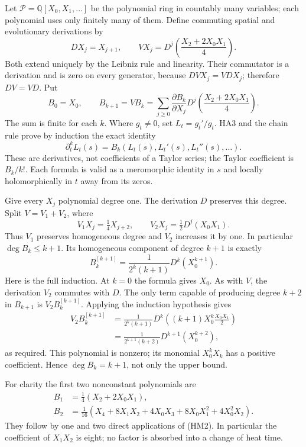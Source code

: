 \documentclass[
  10pt,
  a4paper,
]{article}
\begin{document}
Let \(\mathscr P=\mathbb Q[X_0,X_1,\ldots]\) be the polynomial ring in
countably many variables; each polynomial uses only finitely many of
them. Define commuting spatial and evolutionary derivations by \[
D X_j=X_{j+1},\qquad
V X_j=D^j\!\left(\frac{X_2+2X_0X_1}{4}\right).
\tag{HM1}
\] Both extend uniquely by the Leibniz rule and linearity. Their
commutator is a derivation and is zero on every generator, because
\(DVX_j=VDX_j\); therefore \(DV=VD\). Put \[
B_0=X_0,\qquad B_{k+1}=VB_k
=\sum_{j\ge0}\frac{\partial B_k}{\partial X_j}
D^j\!\left(\frac{X_2+2X_0X_1}{4}\right).
\tag{HM2}
\] The sum is finite for each \(k\). Where \(g_t\ne0\), set
\(L_t=g_t'/g_t\). HA3 and the chain rule prove by induction the exact
identity \[
\partial_t^kL_t(s)=B_k(L_t(s),L_t'(s),L_t''(s),\ldots).
\tag{HM3}
\] These are derivatives, not coefficients of a Taylor series; the
Taylor coefficient is \(B_k/k!\). Each formula is valid as a meromorphic
identity in \(s\) and locally holomorphically in \(t\) away from its
zeros.

Give every \(X_j\) polynomial degree one. The derivation \(D\) preserves
this degree. Split \(V=V_1+V_2\), where \[
V_1X_j=\tfrac14X_{j+2},\qquad
V_2X_j=\tfrac12D^j(X_0X_1).
\tag{HM4}
\] Thus \(V_1\) preserves homogeneous degree and \(V_2\) increases it by
one. In particular \(\deg B_k\le k+1\). Its homogeneous component of
degree \(k+1\) is exactly \[
\boxed{B_k^{[k+1]}=\frac1{2^k(k+1)}D^k(X_0^{k+1}).}
\tag{HM5}
\] Here is the full induction. At \(k=0\) the formula gives \(X_0\). As
with \(V\), the derivation \(V_2\) commutes with \(D\). The only term
capable of producing degree \(k+2\) in \(B_{k+1}\) is
\(V_2B_k^{[k+1]}\). Applying the induction hypothesis gives \[
\begin{aligned}
V_2B_k^{[k+1]}
&=\frac1{2^k(k+1)}D^k\!\left((k+1)X_0^k\frac{X_0X_1}{2}\right)\\
&=\frac1{2^{k+1}(k+2)}D^{k+1}(X_0^{k+2}),
\end{aligned}\tag{HM6}
\] as required. This polynomial is nonzero; its monomial \(X_0^kX_k\)
has a positive coefficient. Hence \(\deg B_k=k+1\), not only the upper
bound.

For clarity the first two nonconstant polynomials are \[
\begin{aligned}
B_1&=\frac14(X_2+2X_0X_1),\\
B_2&=\frac1{16}\left(X_4+8X_1X_2+4X_0X_3
+8X_0X_1^2+4X_0^2X_2\right).
\end{aligned}\tag{HM7}
\] They follow by one and two direct applications of (HM2). In
particular the coefficient of \(X_1X_2\) is eight; no factor is absorbed
into a change of heat time.
\end{document}
